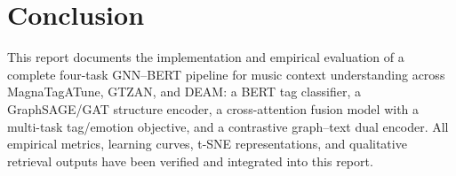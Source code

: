 \documentclass[10pt,twocolumn]{article}
\begin{document}
\section{Conclusion}
This report documents the implementation and empirical evaluation of a complete four-task GNN--BERT pipeline for music context understanding across MagnaTagATune, GTZAN, and DEAM: a BERT tag classifier, a GraphSAGE/GAT structure encoder, a cross-attention fusion model with a multi-task tag/emotion objective, and a contrastive graph--text dual encoder. All empirical metrics, learning curves, t-SNE representations, and qualitative retrieval outputs have been verified and integrated into this report.
\end{document}
